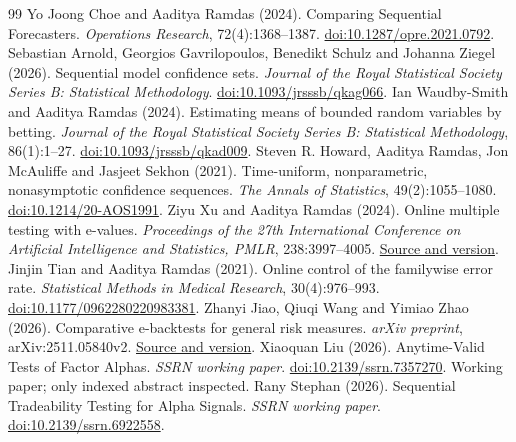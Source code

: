 \begingroup\small\raggedright
\begin{thebibliography}{99}
Yo Joong Choe and Aaditya Ramdas (2024). Comparing Sequential Forecasters. \emph{Operations Research}, 72(4):1368--1387.
\href{https://pubsonline.informs.org/doi/10.1287/opre.2021.0792}{doi:10.1287/opre.2021.0792}.
Sebastian Arnold, Georgios Gavrilopoulos, Benedikt Schulz and Johanna Ziegel (2026). Sequential model confidence sets. \emph{Journal of the Royal Statistical Society Series B: Statistical Methodology}.
\href{https://doi.org/10.1093/jrsssb/qkag066}{doi:10.1093/jrsssb/qkag066}.
Ian Waudby-Smith and Aaditya Ramdas (2024). Estimating means of bounded random variables by betting. \emph{Journal of the Royal Statistical Society Series B: Statistical Methodology}, 86(1):1--27.
\href{https://doi.org/10.1093/jrsssb/qkad009}{doi:10.1093/jrsssb/qkad009}.
Steven R. Howard, Aaditya Ramdas, Jon McAuliffe and Jasjeet Sekhon (2021). Time-uniform, nonparametric, nonasymptotic confidence sequences. \emph{The Annals of Statistics}, 49(2):1055--1080.
\href{https://doi.org/10.1214/20-AOS1991}{doi:10.1214/20-AOS1991}.
Ziyu Xu and Aaditya Ramdas (2024). Online multiple testing with e-values. \emph{Proceedings of the 27th International Conference on Artificial Intelligence and Statistics, PMLR}, 238:3997--4005.
\href{https://proceedings.mlr.press/v238/xu24a.html}{Source and version}.
Jinjin Tian and Aaditya Ramdas (2021). Online control of the familywise error rate. \emph{Statistical Methods in Medical Research}, 30(4):976--993.
\href{https://doi.org/10.1177/0962280220983381}{doi:10.1177/0962280220983381}.
Zhanyi Jiao, Qiuqi Wang and Yimiao Zhao (2026). Comparative e-backtests for general risk measures. \emph{arXiv preprint}, arXiv:2511.05840v2.
\href{https://arxiv.org/abs/2511.05840v2}{Source and version}.
Xiaoquan Liu (2026). Anytime-Valid Tests of Factor Alphas. \emph{SSRN working paper}.
\href{https://papers.ssrn.com/sol3/papers.cfm?abstract_id=7357270}{doi:10.2139/ssrn.7357270}.
Working paper; only indexed abstract inspected.
Rany Stephan (2026). Sequential Tradeability Testing for Alpha Signals. \emph{SSRN working paper}.
\href{https://ssrn.com/abstract=6922558}{doi:10.2139/ssrn.6922558}.

\end{thebibliography}
